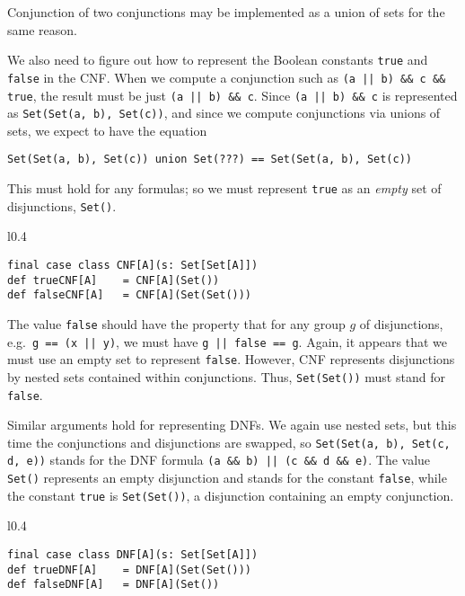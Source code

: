 Conjunction of two conjunctions may be implemented as a union of sets
for the same reason.

We also need to figure out how to represent the Boolean constants
\lstinline!true! and \lstinline!false! in the CNF. When we compute
a conjunction such as \lstinline!(a || b) && c && true!, the result
must be just \lstinline!(a || b) && c!. Since \lstinline!(a || b) && c!
is represented as \lstinline!Set(Set(a, b), Set(c))!, and since we
compute conjunctions via unions of sets, we expect to have the equation
\begin{lstlisting}
Set(Set(a, b), Set(c)) union Set(???) == Set(Set(a, b), Set(c))
\end{lstlisting}
This must hold for any formulas; so we must represent \lstinline!true!
as an \emph{empty} set of disjunctions, \lstinline!Set()!.

\begin{wrapfigure}{l}{0.4\columnwidth}%
\vspace{-0.6\baselineskip}
\begin{lstlisting}
final case class CNF[A](s: Set[Set[A]])
def trueCNF[A]    = CNF[A](Set())
def falseCNF[A]   = CNF[A](Set(Set()))
\end{lstlisting}
\vspace{-0.8\baselineskip}
\end{wrapfigure}%

The value \lstinline!false! should have the property that for any
group $g$ of disjunctions, e.g.~\lstinline!g == (x || y)!, we must
have \lstinline!g || false == g!. Again, it appears that we must
use an empty set to represent \lstinline!false!. However, CNF represents
disjunctions by nested sets contained within conjunctions. Thus, \lstinline!Set(Set())!
must stand for \lstinline!false!.

Similar arguments hold for representing DNFs. We again use nested
sets, but this time the conjunctions and disjunctions are swapped,
so \lstinline!Set(Set(a, b), Set(c, d, e))! stands for the  DNF formula
\lstinline!(a && b) || (c && d && e)!. The value \lstinline!Set()!
represents an empty disjunction and stands for the constant \lstinline!false!,
while the constant \lstinline!true! is \lstinline!Set(Set())!, a
disjunction containing an empty conjunction.

\begin{wrapfigure}{l}{0.4\columnwidth}%
\vspace{-0.6\baselineskip}
\begin{lstlisting}
final case class DNF[A](s: Set[Set[A]])
def trueDNF[A]    = DNF[A](Set(Set()))
def falseDNF[A]   = DNF[A](Set())
\end{lstlisting}
\vspace{-1\baselineskip}
\end{wrapfigure}%


